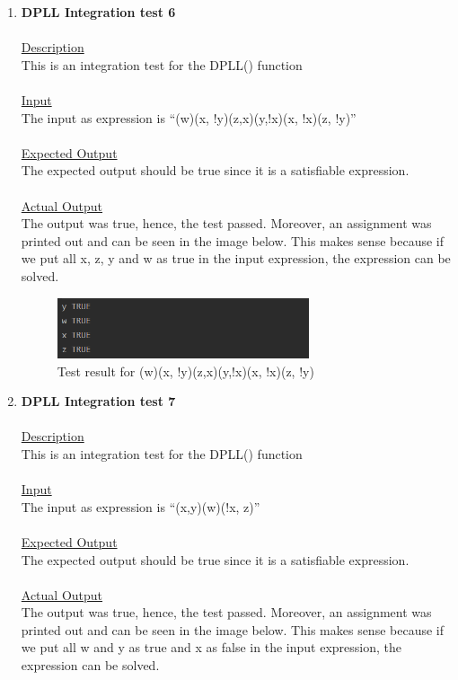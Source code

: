 \documentclass{article}
\newcommand{\quotes}[1]{``#1''}
\begin{document}
\begin{enumerate}
\item \textbf{DPLL Integration test 6}\\\\
		\underline{Description}\\
		\indent This is an integration test for the DPLL() function\\\\
		\underline{Input}\\
		\indent The input as expression is \quotes{(w)(x, !y)(z,x)(y,!x)(x, !x)(z, !y)}\\	\\
		\underline{Expected Output}\\
		\indent The expected output should be true since it is a satisfiable expression.\\\\
		\underline{Actual Output}\\
		The output was true, hence, the test passed. Moreover, an assignment was printed out and can be seen in the image below. This makes sense because if we put all x, z, y and w as true in the input expression, the expression can be solved. 
								\begin{figure}[H]
					\centering
			 			\includegraphics[width=0.7\textwidth]{dplltest6.png}
			 			\centering
			  			\caption{Test result for (w)(x, !y)(z,x)(y,!x)(x, !x)(z, !y)}
			  			\label{fig:dplltest6}
					\end{figure}	
					
					\item \textbf{DPLL Integration test 7}\\\\
		\underline{Description}\\
		\indent This is an integration test for the DPLL() function\\\\
		\underline{Input}\\
		\indent The input as expression is \quotes{(x,y)(w)(!x, z)}\\	\\
		\underline{Expected Output}\\
		\indent The expected output should be true since it is a satisfiable expression.\\\\
		\underline{Actual Output}\\
		The output was true, hence, the test passed. Moreover, an assignment was printed out and can be seen in the image below. This makes sense because if we put all w and y as true and x as false in the input expression, the expression can be solved. 


\end{enumerate}
\end{document}
